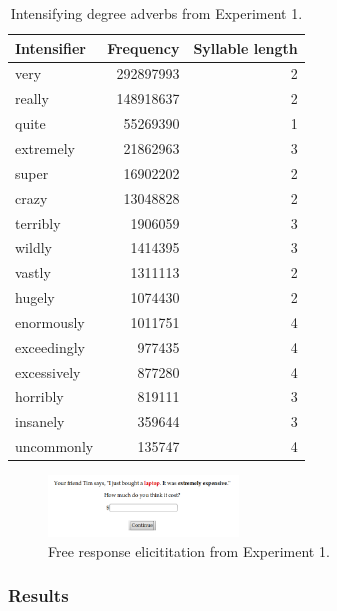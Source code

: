 \documentclass[10pt,letterpaper]{article}
\begin{document}
      \begin{table}[!ht]
      \begin{center} 
      \caption{Intensifying degree adverbs from Experiment 1.} 
      \label{intensifiers-table} 
      \vskip 0.12in
      \begin{tabular}{lrr} 
      \hline
      Intensifier    &  Frequency & Syllable length \\
      \hline
      very & 292897993 & 2 \\ 
      really & 148918637 & 2 \\ 
      quite & 55269390 & 1 \\ 
      extremely & 21862963 & 3 \\ 
      super & 16902202 & 2 \\ 
      crazy & 13048828 & 2 \\ 
      terribly & 1906059 & 3 \\ 
      wildly & 1414395 & 3 \\ 
      vastly & 1311113 & 2 \\ 
      hugely & 1074430 & 2 \\ 
      enormously & 1011751 & 4 \\ 
      exceedingly & 977435 & 4 \\ 
      excessively & 877280 & 4 \\ 
      horribly & 819111 & 3 \\ 
      insanely & 359644 & 3 \\ 
      uncommonly & 135747 & 4 \\
      \hline
      \end{tabular} 
      \end{center} 
      \end{table}
    
      \begin{figure}[ht]
      \begin{center}
      \includegraphics[width=0.45\textwidth]{screenshot.png}
      \end{center}
      \caption{Free response elicititation from Experiment 1.}
      \label{screenshot-figure}
      \end{figure}
      
  \subsubsection{Results}
  
\end{document}

